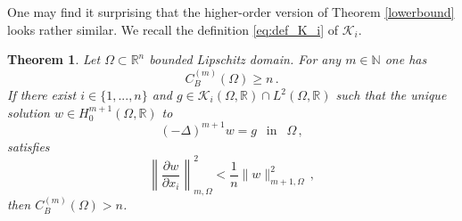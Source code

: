 \documentclass[11pt]{article}
\newtheorem{theorem}{Theorem}[section]
\theoremstyle{plain}
\theoremstyle{definition}
\numberwithin{equation}{section}
\newcommand{\R}{\mathbb{R}}
\begin{document}
One may find it surprising that the higher-order version of Theorem \ref{lowerbound} looks rather similar. We recall the definition \eqref{eq:def_K_i} of $\mathcal{K}_{i}$.

\begin{theorem}\label{lowerboundHO}
	Let $\Omega\subset\R^n$ bounded Lipschitz domain. For any $m \in \mathbb{N}$ one has
	$$
	C^{(m)}_{B}(\Omega)\ge n \, .
	$$
	If there exist $i \in \{1,...,n\}$ and $g\in\mathcal{K}_{i}(\Omega, \mathbb{R}) \cap L^{2}(\Omega, \mathbb{R})$ such that the unique solution $w \in H^{m+1}_{0}(\Omega, \mathbb{R})$ to
	\begin{equation}\label{generalTorsionho}
		(-\Delta)^{m+1} w = g \ \ \mbox{ in } \ \ \Omega \, ,
	\end{equation}
	satisfies
	\begin{equation}\label{conditionho}
		\left\| \dfrac{\partial w}{\partial x_{i}} \right\|^{2}_{m, \Omega} < \frac{1}{n} \| w \|^{2}_{m+1, \Omega} \, ,
	\end{equation}
	then $C_{B}^{(m)}(\Omega)>n$.\\
\end{theorem}
\noindent
\end{document}
